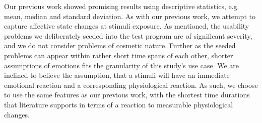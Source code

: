 Our previous work\cite{first_paper} showed promising results using descriptive statistics, e.g. mean, median and standard deviation. 
As with our previous work, we attempt to capture affective state changes at stimuli exposure. 
As mentioned, the usability problems we deliberately seeded into the test program are of significant severity, and we do not consider problems of cosmetic nature.
Further as the seeded problems can appear within rather short time spans of each other, shorter assumptions of emotions fits the granularity of this study's use case. 
We are inclined to believe the assumption, that a stimuli will have an immediate emotional reaction and a corresponding physiological reaction.
As such, we choose to use the same features as our previous work, with the shortest time durations that literature supports in terms of a reaction to measurable physiological changes. 
